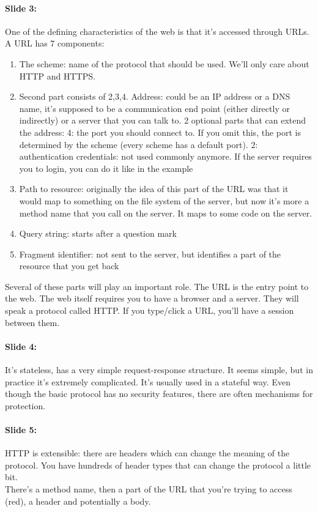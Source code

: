 \documentclass[10pt,a4paper]{report}
\begin{document}
\paragraph{Slide 3:} One of the defining characteristics of the web is that it's accessed through URLs. A URL has 7 components:
\begin{enumerate}
\item The scheme: name of the protocol that should be used. We'll only care about HTTP and HTTPS.
\item Second part consists of 2,3,4. Address: could be an IP address or a DNS name, it's supposed to be a communication end point (either directly or indirectly) or a server that you can talk to. 2 optional parts that can extend the address: 4: the port you should connect to. If you omit this, the port is determined by the scheme (every scheme has a default port). 2: authentication credentials: not used commonly anymore. If the server requires you to login, you can do it like in the example
\setcounter{enumi}{4}
\item Path to resource: originally the idea of this part of the URL was that it would map to something on the file system of the server, but now it's more a method name that you call on the server. It maps to some code on the server.
\item Query string: starts after a question mark
\item Fragment identifier: not sent to the server, but identifies a part of the resource that you get back
\end{enumerate}
Several of these parts will play an important role. 
The URL is the entry point to the web. The web itself requires you to have a browser and a server. They will speak a protocol called HTTP. If you type/click a URL, you'll have a session between them.

\paragraph{Slide 4:} It's stateless, has a very simple request-response structure. It seems simple, but in practice it's extremely complicated. It's usually used in a stateful way. Even though the basic protocol has no security features, there are often mechanisms for protection.

\paragraph{Slide 5:} HTTP is extensible: there are headers which can change the meaning of the protocol. You have hundreds of header types that can change the protocol a little bit.\\
There's a method name, then a part of the URL that you're trying to access (red), a header and potentially a body.
\end{document}
